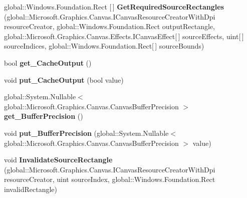\begin{DoxyCompactItemize}
global\+::\+Windows.\+Foundation.\+Rect \mbox{[}$\,$\mbox{]} {\bfseries Get\+Required\+Source\+Rectangles} (global\+::\+Microsoft.\+Graphics.\+Canvas.\+I\+Canvas\+Resource\+Creator\+With\+Dpi resource\+Creator, global\+::\+Windows.\+Foundation.\+Rect output\+Rectangle, global\+::\+Microsoft.\+Graphics.\+Canvas.\+Effects.\+I\+Canvas\+Effect\mbox{[}$\,$\mbox{]} source\+Effects, uint\mbox{[}$\,$\mbox{]} source\+Indices, global\+::\+Windows.\+Foundation.\+Rect\mbox{[}$\,$\mbox{]} source\+Bounds)
\item 
\mbox{\label{interface_microsoft_1_1_graphics_1_1_canvas_1_1_effects_1_1_i_canvas_effect_ade35aa78196aaa6fe9447696abb6d07f}} 
bool {\bfseries get\+\_\+\+Cache\+Output} ()
\item 
\mbox{\label{interface_microsoft_1_1_graphics_1_1_canvas_1_1_effects_1_1_i_canvas_effect_a83327dc0bb363f6f878802f5c971c033}} 
void {\bfseries put\+\_\+\+Cache\+Output} (bool value)
\item 
\mbox{\label{interface_microsoft_1_1_graphics_1_1_canvas_1_1_effects_1_1_i_canvas_effect_acbbcd7b5f2c9c1556c6ae4851cb48afa}} 
global\+::\+System.\+Nullable$<$ global\+::\+Microsoft.\+Graphics.\+Canvas.\+Canvas\+Buffer\+Precision $>$ {\bfseries get\+\_\+\+Buffer\+Precision} ()
\item 
\mbox{\label{interface_microsoft_1_1_graphics_1_1_canvas_1_1_effects_1_1_i_canvas_effect_ac02a7bea19253c3a3cf5522b88da9a92}} 
void {\bfseries put\+\_\+\+Buffer\+Precision} (global\+::\+System.\+Nullable$<$ global\+::\+Microsoft.\+Graphics.\+Canvas.\+Canvas\+Buffer\+Precision $>$ value)
\item 
\mbox{\label{interface_microsoft_1_1_graphics_1_1_canvas_1_1_effects_1_1_i_canvas_effect_aa08a935649c3289f85829be386bd22e0}} 
void {\bfseries Invalidate\+Source\+Rectangle} (global\+::\+Microsoft.\+Graphics.\+Canvas.\+I\+Canvas\+Resource\+Creator\+With\+Dpi resource\+Creator, uint source\+Index, global\+::\+Windows.\+Foundation.\+Rect invalid\+Rectangle)

\end{DoxyCompactItemize}
